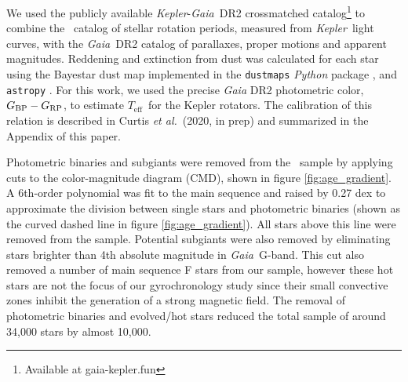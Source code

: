 \documentclass{aastex63}
\newcommand{\etal}{{\it et al.}}
\newcommand{\kepler}{{\it Kepler}}
\newcommand{\gaia}{{\it Gaia}}
\newcommand{\teff}{$T_{\mathrm{eff}}$}
\newcommand{\mct}{\citet{mcquillan2014}}
\newcommand{\racomment}[1]{{\color{blue}#1}}
\begin{document}
We used the publicly available \kepler-\gaia\ DR2 crossmatched
catalog\footnote{Available at gaia-kepler.fun} to combine the \mct\ catalog of
stellar rotation periods, measured from \kepler\ light curves, with the \gaia\
DR2 catalog of parallaxes, proper motions and apparent magnitudes.
Reddening and extinction from dust was calculated for each star using the
Bayestar dust map implemented in the {\tt dustmaps} {\it Python} package
\citep{green2018}, and {\tt astropy} \citep{astropy2013, astropy2018}.
For this work, we used the precise \textit{Gaia} DR2 photometric color,
$G_{\rm BP} - G_{\rm RP}$, to estimate \teff\ for the Kepler rotators.
\racomment{The calibration of this relation is described in Curtis \etal\ (2020,
in prep) and summarized in the Appendix of this paper.}

Photometric binaries and subgiants were removed from the \mct\ sample by
applying cuts to the color-magnitude diagram (CMD), shown in figure
\ref{fig:age_gradient}.
A 6th-order polynomial was fit to the main sequence and raised by 0.27 dex to
approximate the division between single stars and photometric binaries (shown
as the curved dashed line in figure \ref{fig:age_gradient}).
All stars above this line were removed from the sample.
Potential subgiants were also removed by eliminating stars brighter than 4th
absolute magnitude in \gaia\ G-band.
This cut also removed a number of main sequence F stars from our sample,
however these hot stars are not the focus of our gyrochronology study since
their small convective zones inhibit the generation of a strong magnetic
field.
The removal of photometric binaries and evolved/hot stars reduced the total
sample of around 34,000 stars by almost 10,000.
\end{document}
